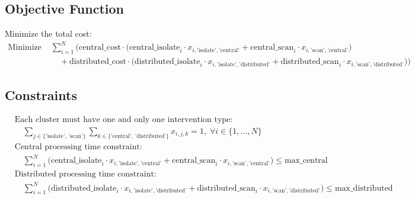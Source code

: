 \documentclass{article}
\begin{document}
\subsection*{Objective Function}
Minimize the total cost:
\begin{align*}
    \text{Minimize } &\sum_{i=1}^{N} \Bigg( \text{central\_cost} \cdot \big( \text{central\_isolate}_i \cdot x_{i,\text{'isolate'},\text{'central'}} + \text{central\_scan}_i \cdot x_{i,\text{'scan'},\text{'central'}} \big) \\
    &\quad + \text{distributed\_cost} \cdot \big( \text{distributed\_isolate}_i \cdot x_{i,\text{'isolate'},\text{'distributed'}} + \text{distributed\_scan}_i \cdot x_{i,\text{'scan'},\text{'distributed'}} \big) \Bigg)
\end{align*}

\subsection*{Constraints}
\begin{align*}
    &\text{Each cluster must have one and only one intervention type:} \\
    &\quad \sum_{j \in \{\text{'isolate', 'scan'}\}} \sum_{k \in \{\text{'central', 'distributed'}\}} x_{i,j,k} = 1, \; \forall i \in \{1, ..., N\} \\
    &\text{Central processing time constraint:} \\
    &\quad \sum_{i=1}^{N} \big( \text{central\_isolate}_i \cdot x_{i,\text{'isolate'},\text{'central'}} + \text{central\_scan}_i \cdot x_{i,\text{'scan'},\text{'central'}} \big) \leq \text{max\_central} \\
    &\text{Distributed processing time constraint:} \\
    &\quad \sum_{i=1}^{N} \big( \text{distributed\_isolate}_i \cdot x_{i,\text{'isolate'},\text{'distributed'}} + \text{distributed\_scan}_i \cdot x_{i,\text{'scan'},\text{'distributed'}} \big) \leq \text{max\_distributed} \\
\end{align*}
\end{document}
